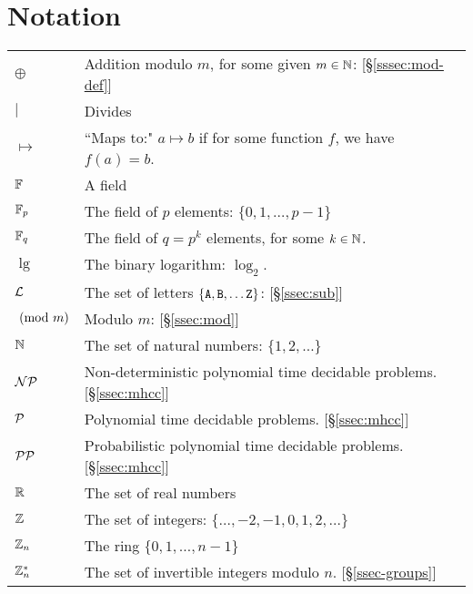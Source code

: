 \chapter*{Notation}

\begin{tabular}{ll}%
$\oplus$	& Addition modulo $m$, for some given $m\in\N$: [\S\ref{sssec:mod-def}]\\
$\mid$		& Divides\\
$\mapsto$	& ``Maps to:" $a \mapsto b$ if for some function $f$, we have $f(a)=b$.\\
$\F$ 		& A field\\
$\Fp$		& The field of $p$ elements: $\{0, 1, \ldots, p-1\}$\\
$\Fq$		& The field of $q = p^k$ elements, for some $k \in \N$.\\
$\lg$		& The binary logarithm: $\log_2$.\\
$\LL$ 		& The set of letters $\{\tt{A}, \tt{B}, \ldots \tt{Z}\}$: [\S\ref{ssec:sub}] \\
$\ppmod{m}$  	& Modulo $m$: [\S \ref{ssec:mod}]\\
$\N$		& The set of natural numbers: $\{1, 2, \ldots\}$\\
$\NP$		& Non-deterministic polynomial time decidable problems. [\S\ref{ssec:mhcc}]\\
$\P$		& Polynomial time decidable problems. [\S\ref{ssec:mhcc}]\\
$\PP$		& Probabilistic polynomial time decidable problems. [\S\ref{ssec:mhcc}]\\
$\R$		& The set of real numbers \\
$\Z$		& The set of integers: $\{\ldots, -2, -1, 0, 1, 2, \ldots\}$\\
$\Z_n$		& The ring $\{0, 1, \ldots, n-1\}$\\
$\Z_n^*$	& The set of invertible integers modulo $n$. [\S\ref{ssec-groups}]
\end{tabular}
